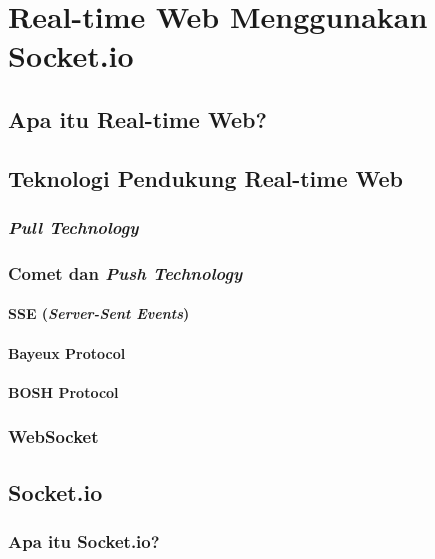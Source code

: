 \chapter{Real-time Web Menggunakan Socket.io}

\section{Apa itu Real-time Web?}

\section{Teknologi Pendukung Real-time Web}

\subsection{\textit{Pull Technology}}

\subsection{Comet dan \textit{Push Technology}}

\subsubsection{SSE (\textit{Server-Sent Events})}

\subsubsection{Bayeux Protocol}

\subsubsection{BOSH Protocol}

\subsection{WebSocket}


\section{Socket.io}

\subsection{Apa itu Socket.io?}

